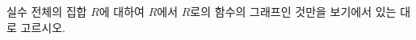 실수 전체의 집합 $R$에 대하여 $R$에서 $R$로의 함수의 그래프인 것만을 보기에서 있는 대로 고르시오.\bogi{\resizebox{\ifdim\width>\linewidth\linewidth\else\width\fi}{!}{}}
